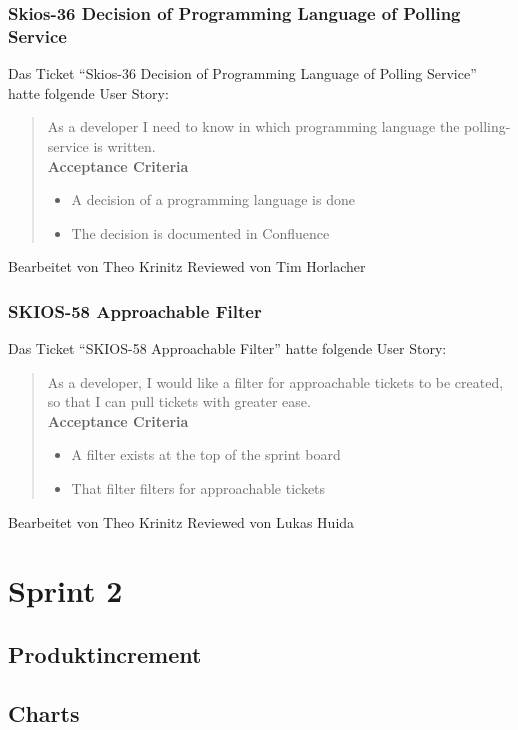 \subsubsection{Skios-36 Decision of Programming Language of Polling Service}
Das Ticket \enquote{Skios-36 Decision of Programming Language of Polling Service} hatte folgende User Story:
\begin{quotation}
    As a developer I need to know in which programming language the polling-service is written. \\
    \textbf{Acceptance Criteria}
    \begin{itemize}
        \item A decision of a programming language is done
        \item The decision is documented in Confluence
    \end{itemize}
\end{quotation}
Bearbeitet von Theo Krinitz
Reviewed von Tim Horlacher

\subsubsection{SKIOS-58 Approachable Filter}
Das Ticket \enquote{SKIOS-58 Approachable Filter} hatte folgende User Story:
\begin{quotation}
    As a developer, I would like a filter for approachable tickets to be created, so that I can pull tickets with greater ease.\\
    \textbf{Acceptance Criteria}
    \begin{itemize}
        \item A filter exists at the top of the sprint board
        \item That filter filters for approachable tickets
    \end{itemize}
\end{quotation}
Bearbeitet von Theo Krinitz
Reviewed von Lukas Huida

\section{Sprint 2}
\subsection{Produktincrement}
\subsection{Charts}
